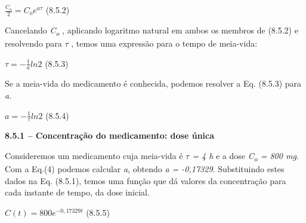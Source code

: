 \documentclass[12pt]{article}
\begin{document}
\begin{enumerate}
\begin{FlushRight}
 \( \frac{C_{o}}{2}=C_{o}e^{a \tau} \) \tab \tab \tab \tab \tab \tab (8.5.2)
\end{FlushRight}\par

\begin{justify}
Cancelando \textit{C\textsubscript{o}} , aplicando logaritmo natural em ambos os membros de (8.5.2) e resolvendo para $ \tau$ , temos uma expressão para o tempo de meia-vida:
\end{justify}\par

\begin{FlushRight}
 \(  \tau=-\frac{1}{a}ln2 \) \tab \tab \tab \tab \tab \tab (8.5.3)
\end{FlushRight}\par

\begin{justify}
Se a meia-vida do medicamento é conhecida, podemos resolver a Eq. (8.5.3) para \textit{a}. 
\end{justify}\par

\begin{FlushRight}
 \( a=-\frac{1}{ \tau}ln2 \) \tab \tab \tab \tab \tab \tab (8.5.4)
\end{FlushRight}\par


\vspace{\baselineskip}
\begin{justify}
{\fontsize{14pt}{16.8pt}\selectfont \textbf{8.5.1 – Concentração do medicamento: dose única}\par}
\end{justify}\par

\begin{justify}
Consideremos um medicamento cuja meia-vida é \textit{$ \tau$  = 4 h} e a dose \textit{C\textsubscript{o} = 800 mg}. Com a Eq.(4) podemos calcular \textit{a}, obtendo \textit{a = -0,17329}. Substituindo estes dados na Eq. (8.5.1), temos uma função que dá valores da concentração para cada instante de tempo, da dose inicial.
\end{justify}\par

\begin{FlushRight}
 \( C \left( t \right) =800e^{-0,17329 t} \) \tab \tab \tab \tab (8.5.5)
\end{FlushRight}\par


\end{enumerate}
\end{document}

